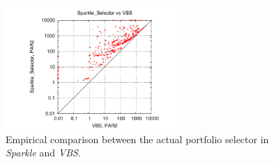 \documentclass[british]{article}
\begin{document}
\begin{figure}[t]
\noindent \begin{centering}
\includegraphics[width=0.6\textwidth]{figure_portfolio_selector_sparkle_vs_vbs}
\par\end{centering}

\caption{Empirical comparison between the actual portfolio selector in \emph{Sparkle} and \emph{VBS}.}\label{fig:sparkle_vs_vbs}
\end{figure}





\end{document}
